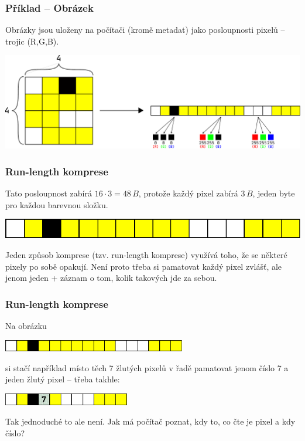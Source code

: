 \documentclass[aspectratio=169,11pt,svgnames,handout]{beamer}
\begin{document}
\begin{frame}
 \frametitle{Příklad -- Obrázek}
 Obrázky jsou uloženy na počítači (kromě metadat) jako posloupnosti pixelů --
 trojic (R,G,B).
 \begin{center}
  \includegraphics[width=\textwidth]{image-3.pdf}
 \end{center}
\end{frame}

\begin{frame}
 \frametitle{Run-length komprese}
 Tato posloupnost zabírá $16 \cdot 3 = 48\,B$, protože každý pixel zabírá
 $3\,B$, jeden byte pro každou barevnou složku.
 \begin{center}
  \includegraphics[width=.5\textwidth]{image-4.pdf}
 \end{center}
 \pause
 Jeden způsob komprese (tzv. \alert{run-length} komprese) využívá toho, že
 se některé pixely po sobě opakují.
 \pause
 Není proto třeba si pamatovat každý pixel zvlášť, ale jenom jeden + záznam o
 tom, kolik takových jde za sebou.
\end{frame}

\begin{frame}
 \frametitle{Run-length komprese}
 Na obrázku
 \begin{center}
  \includegraphics[width=8cm]{image-4.pdf}
 \end{center}
 si stačí například místo těch 7 žlutých pixelů v řadě pamatovat jenom číslo 7 a
 jeden žlutý pixel -- třeba takhle:
 \begin{center}
  \includegraphics[width=5.5cm]{image-5.pdf}
 \end{center}
 \pause
 Tak jednoduché to ale není. Jak má počítač poznat, kdy to, co čte je pixel a
 kdy číslo?
\end{frame}
\end{document}
